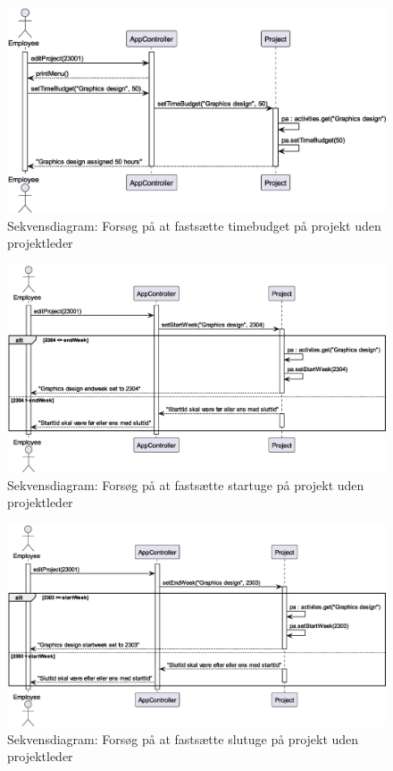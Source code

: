 \begin{figure}[H]
    \centering
    \caption{Sekvensdiagram: Forsøg på at fastsætte timebudget på projekt uden projektleder}\label{fig:sequence_create_PA_no_PL_2}
    \includegraphics[width = .75\textwidth]{Diagrams/createActivityNoPLCase2.eps}
\end{figure}
\begin{figure}[H]
    \centering
    \caption{Sekvensdiagram: Forsøg på at fastsætte startuge på projekt uden projektleder}\label{fig:sequence_create_PA_no_PL_3}
    \includegraphics[width = .9\textwidth]{Diagrams/createActivityNoPLCase3.eps}
\end{figure}
\begin{figure}[H]
    \centering
    \caption{Sekvensdiagram: Forsøg på at fastsætte slutuge på projekt uden projektleder}\label{fig:sequence_create_PA_no_PL_4}
    \includegraphics[width = .9\textwidth]{Diagrams/createActivityNoPLCase4.eps}
\end{figure}
